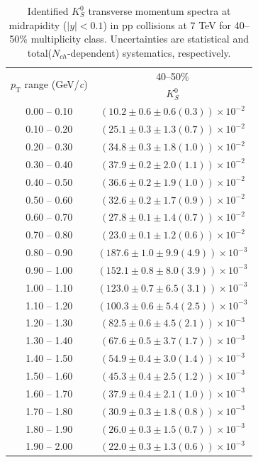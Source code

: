 \begin{table}
\caption{Identified $K^{0}_{S}$ transverse momentum spectra at midrapidity ($|y|<0.1$) in pp collisions at 7 TeV for 40--50\% multiplicity class. Uncertainties are statistical and total($N_{ch}$-dependent) systematics, respectively.}
\label{tab:K0Short_40to50}
\begin{center}
\begin{tabular}{ c | c }
\hline
\multirow{2}{*}{$p_{\mathrm{T}}$ range (GeV/\textit{c})} & \multicolumn{1}{c}{40--50\%} \\ & $K^{0}_{S}$\\ 
\hline
0.00 -- 0.10 & $(10.2\pm0.6\pm0.6(0.3))\times10^{-2}$ \\ 
0.10 -- 0.20 & $(25.1\pm0.3\pm1.3(0.7))\times10^{-2}$ \\ 
0.20 -- 0.30 & $(34.8\pm0.3\pm1.8(1.0))\times10^{-2}$ \\ 
0.30 -- 0.40 & $(37.9\pm0.2\pm2.0(1.1))\times10^{-2}$ \\ 
0.40 -- 0.50 & $(36.6\pm0.2\pm1.9(1.0))\times10^{-2}$ \\ 
0.50 -- 0.60 & $(32.6\pm0.2\pm1.7(0.9))\times10^{-2}$ \\ 
0.60 -- 0.70 & $(27.8\pm0.1\pm1.4(0.7))\times10^{-2}$ \\ 
0.70 -- 0.80 & $(23.0\pm0.1\pm1.2(0.6))\times10^{-2}$ \\ 
0.80 -- 0.90 & $(187.6\pm1.0\pm9.9(4.9))\times10^{-3}$ \\ 
0.90 -- 1.00 & $(152.1\pm0.8\pm8.0(3.9))\times10^{-3}$ \\ 
1.00 -- 1.10 & $(123.0\pm0.7\pm6.5(3.1))\times10^{-3}$ \\ 
1.10 -- 1.20 & $(100.3\pm0.6\pm5.4(2.5))\times10^{-3}$ \\ 
1.20 -- 1.30 & $(82.5\pm0.6\pm4.5(2.1))\times10^{-3}$ \\ 
1.30 -- 1.40 & $(67.6\pm0.5\pm3.7(1.7))\times10^{-3}$ \\ 
1.40 -- 1.50 & $(54.9\pm0.4\pm3.0(1.4))\times10^{-3}$ \\ 
1.50 -- 1.60 & $(45.3\pm0.4\pm2.5(1.2))\times10^{-3}$ \\ 
1.60 -- 1.70 & $(37.9\pm0.4\pm2.1(1.0))\times10^{-3}$ \\ 
1.70 -- 1.80 & $(30.9\pm0.3\pm1.8(0.8))\times10^{-3}$ \\ 
1.80 -- 1.90 & $(26.0\pm0.3\pm1.5(0.7))\times10^{-3}$ \\ 
1.90 -- 2.00 & $(22.0\pm0.3\pm1.3(0.6))\times10^{-3}$ \\ 

\end{tabular}
\end{center}
\end{table}
